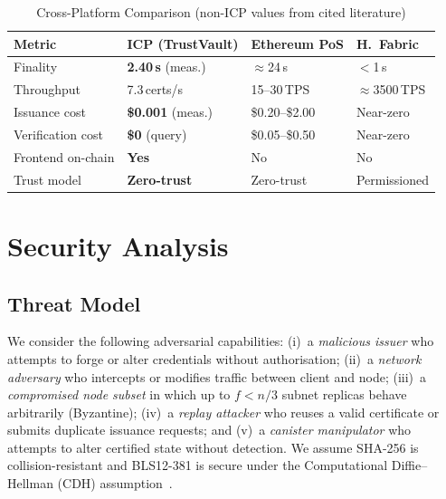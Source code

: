 \documentclass[conference]{IEEEtran}
\begin{document}
\begin{table}[t]
\caption{Cross-Platform Comparison (non-ICP values from cited literature)}
\label{tab:comparison}
\centering\small\renewcommand{\arraystretch}{1.2}
\setlength{\tabcolsep}{3pt}
\begin{tabular}{@{}llll@{}}
\toprule
\textbf{Metric} & \textbf{ICP (TrustVault)} & \textbf{Ethereum PoS} & \textbf{H.\ Fabric} \\
\midrule
Finality          & \textbf{2.40\,s} (meas.)  & $\approx$24\,s \cite{buterin2020eth2}  & $<$1\,s \cite{androulaki2018fabric} \\
Throughput        & 7.3\,certs/s              & 15--30\,TPS \cite{dinh2017blockbench}  & $\approx$3500\,TPS \cite{androulaki2018fabric} \\
Issuance cost     & \textbf{\$0.001} (meas.)  & \$0.20--\$2.00 \cite{wood2014ethereum} & Near-zero \\
Verification cost & \textbf{\$0} (query)      & \$0.05--\$0.50 \cite{wood2014ethereum} & Near-zero \\
Frontend on-chain & \textbf{Yes}              & No                                     & No \\
Trust model       & \textbf{Zero-trust}       & Zero-trust                             & Permissioned \\
\bottomrule
\end{tabular}
\end{table}

\section{Security Analysis}
\label{sec:security}

\subsection{Threat Model}

We consider the following adversarial capabilities: (i)~a \emph{malicious issuer} who attempts to forge or alter credentials without authorisation; (ii)~a \emph{network adversary} who intercepts or modifies traffic between client and node; (iii)~a \emph{compromised node subset} in which up to $f < n/3$ subnet replicas behave arbitrarily (Byzantine); (iv)~a \emph{replay attacker} who reuses a valid certificate or submits duplicate issuance requests; and (v)~a \emph{canister manipulator} who attempts to alter certified state without detection. We assume SHA-256 is collision-resistant and BLS12-381 is secure under the Computational Diffie--Hellman (CDH) assumption~\cite{boneh2001bls}.
\end{document}
